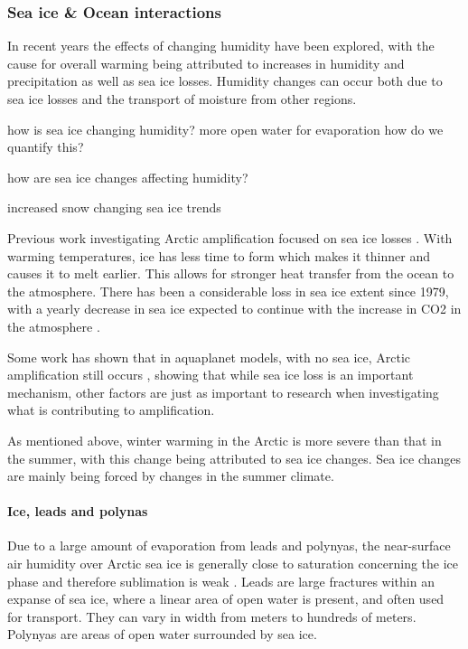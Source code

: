 \documentclass[11pt, oneside]{article}
\begin{document}
\subsubsection{Sea ice \& Ocean interactions}
In recent years the effects of changing humidity have been explored, with the cause for overall warming being attributed to increases in humidity and precipitation \cite{mccrystall2021new} as well as sea ice losses. Humidity changes can occur both due to sea ice losses and the transport of moisture from other regions. 

how is sea ice changing humidity?
more open water for evaporation 
how do we quantify this?

how are sea ice changes affecting humidity?

increased snow changing sea ice trends


Previous work investigating Arctic amplification focused on sea ice losses \cite{serreze2009emergence}. With warming temperatures, ice has less time to form which makes it thinner and causes it to melt earlier. This allows for stronger heat transfer from the ocean to the atmosphere. There has been a considerable loss in sea ice extent since 1979, with a yearly decrease in sea ice expected to continue with the increase in CO2 in the atmosphere \cite{dai2019arctic}. 

Some work has shown that in aquaplanet models, with no sea ice, Arctic amplification still occurs \cite{russotto2020polar}, showing that while sea ice loss is an important mechanism, other factors are just as important to research when investigating what is contributing to amplification. 

As mentioned above, winter warming in the Arctic is more severe than that in the summer, with this change being attributed to sea ice changes. Sea ice changes are mainly being forced by changes in the summer climate. 
\paragraph{Ice, leads and polynas}
 Due to a large amount of evaporation from leads and polynyas, the near-surface air humidity over Arctic sea ice is generally close to saturation concerning the ice phase and therefore sublimation is weak \cite{andreas2002near}. Leads are large fractures within an expanse of sea ice, where a linear area of open water is present, and often used for transport. They can vary in width from meters to hundreds of meters. Polynyas are areas of open water surrounded by sea ice.
\end{document}
